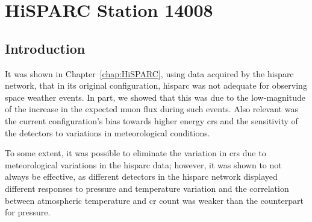 \chapter{HiSPARC Station 14008}\label{chap:HiSPARC_14008}

\section{Introduction}\label{sec:HS_14008_intro}


%



It was shown in Chapter~\ref{chap:HiSPARC}, using data acquired by the \gls{hisparc} network, that in its original configuration, \gls{hisparc} was not adequate for observing space weather events. In part, we showed that this was due to the low-magnitude of the increase in the expected muon flux during such events. Also relevant was the current configuration's bias towards higher energy \glspl{cr} and the sensitivity of the detectors to variations in meteorological conditions.

To some extent, it was possible to eliminate the variation in \glspl{cr} due to meteorological variations in the \gls{hisparc} data; however, it was shown to not always be effective, as different detectors in the \gls{hisparc} network displayed different responses to pressure and temperature variation and the correlation between atmospheric temperature and \gls{cr} count was weaker than the counterpart for pressure.

